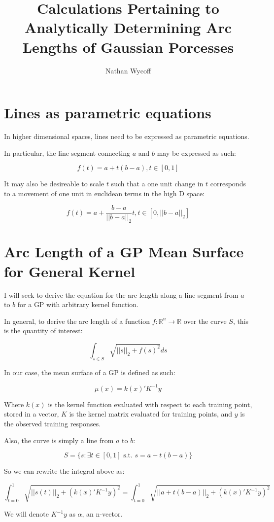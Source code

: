 \documentclass{article}
\title{Calculations Pertaining to Analytically Determining Arc Lengths of Gaussian Porcesses}
\author{Nathan Wycoff}
\begin{document}
	\maketitle
	
	\section{Lines as parametric equations}
	
	In higher dimensional spaces, lines need to be expressed as parametric equations.
	
	In particular, the line segment connecting $a$ and $b$ may be expressed as such:
	
	$$f(t) = a + t(b-a), t \in [0,1]$$
	
	It may also be desireable to scale $t$ such that a one unit change in $t$ corresponds to a movement of one unit in euclidean terms in the high D space:
	
	$$f(t) = a + \frac{b - a}{||b - a||_2} t, t \in [0,||b - a||_2]$$
	
	\section{Arc Length of a GP Mean Surface for General Kernel}
	
	I will seek to derive the equation for the arc length along a line segment from $a$ to $b$ for a GP with arbitrary kernel function.
	
	In general, to derive the arc length of a function $f: \mathbb{R}^n \to \mathbb{R}$ over the curve $S$, this is the quantity of interest:
	
	$$\int_{s \in S} \sqrt{||s||_2 + f(s)^2} ds$$
	
	In our case, the mean surface of a GP is defined as such:
	
	$$\mu(x) = k(x)' K^{-1} y$$
	
	Where $k(x)$ is the kernel function evaluated with respect to each training point, stored in a vector, $K$ is the kernel matrix evaluated for training points, and $y$ is the observed training responses.
	
	Also, the curve is simply a line from $a$ to $b$:
	
	$$S = \{s : \exists t \in [0,1] \textrm{ s.t. } s = a + t(b-a) \}$$
	
	So we can rewrite the integral above as:
	
	$$\int_{t=0}^1 \sqrt{||s(t)||_2 + (k(x)'K^{-1}y)^2} = \int_{t=0}^1 \sqrt{||a + t(b-a)||_2 + (k(x)'K^{-1}y)^2}$$
	
	We will denote $K^{-1}y$ as $\alpha$, an n-vector.
	
	
\end{document}

